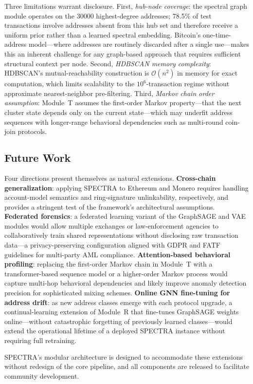 \documentclass[journal]{IEEEtran}
\begin{document}
Three limitations warrant disclosure.
First, \emph{hub-node coverage}: the spectral graph module operates on the
\num{30000} highest-degree addresses; \num{78.5}\% of test transactions
involve addresses absent from this hub set and therefore receive a uniform
prior rather than a learned spectral embedding.
Bitcoin's one-time-address model---where addresses are routinely discarded
after a single use---makes this an inherent challenge for any graph-based
approach that requires sufficient structural context per node.
Second, \emph{HDBSCAN memory complexity}: HDBSCAN's mutual-reachability
construction is $\mathcal{O}(n^2)$ in memory for exact computation, which
limits scalability to the $10^6$-transaction regime without approximate
nearest-neighbor pre-filtering.
Third, \emph{Markov chain order assumption}: Module~T assumes the first-order
Markov property---that the next cluster state depends only on the current
state---which may underfit address sequences with longer-range behavioral
dependencies such as multi-round coin-join protocols.

\subsection*{Future Work}

Four directions present themselves as natural extensions.
\textbf{Cross-chain generalization}: applying SPECTRA to Ethereum and
Monero requires handling account-model semantics and ring-signature
unlinkability, respectively, and provides a stringent test of the
framework's architectural assumptions.
\textbf{Federated forensics}: a federated learning variant of the
GraphSAGE and VAE modules would allow multiple exchanges or law-enforcement
agencies to collaboratively train shared representations without disclosing
raw transaction data---a privacy-preserving configuration aligned with
GDPR and FATF guidelines for multi-party AML compliance.
\textbf{Attention-based behavioral profiling}: replacing the first-order
Markov chain in Module~T with a transformer-based sequence model or a
higher-order Markov process would capture multi-hop behavioral dependencies
and likely improve anomaly detection precision for sophisticated mixing
schemes.
\textbf{Online GNN fine-tuning for address drift}: as new address classes
emerge with each protocol upgrade, a continual-learning extension of
Module~R that fine-tunes GraphSAGE weights online---without catastrophic
forgetting of previously learned classes---would extend the operational
lifetime of a deployed SPECTRA instance without requiring full retraining.

\textsc{SPECTRA}'s modular architecture is designed to accommodate these
extensions without redesign of the core pipeline, and all components are
released to facilitate community development.



\end{document}
